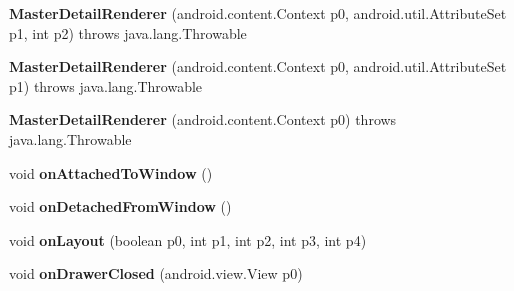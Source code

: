 \begin{DoxyCompactItemize}
\item 
\mbox{\label{classmd5b60ffeb829f638581ab2bb9b1a7f4f3f_1_1_master_detail_renderer_a151e8a0190a84dac40712c929fe981f1}} 
{\bfseries Master\+Detail\+Renderer} (android.\+content.\+Context p0, android.\+util.\+Attribute\+Set p1, int p2)  throws java.\+lang.\+Throwable 	
\item 
\mbox{\label{classmd5b60ffeb829f638581ab2bb9b1a7f4f3f_1_1_master_detail_renderer_a20b50dd51874695ded02789310f2c483}} 
{\bfseries Master\+Detail\+Renderer} (android.\+content.\+Context p0, android.\+util.\+Attribute\+Set p1)  throws java.\+lang.\+Throwable 	
\item 
\mbox{\label{classmd5b60ffeb829f638581ab2bb9b1a7f4f3f_1_1_master_detail_renderer_a14ed5c8eab58b78a200c47600daacb7b}} 
{\bfseries Master\+Detail\+Renderer} (android.\+content.\+Context p0)  throws java.\+lang.\+Throwable 	
\item 
\mbox{\label{classmd5b60ffeb829f638581ab2bb9b1a7f4f3f_1_1_master_detail_renderer_acc8d8c4d884449690cd40a8f06d08aab}} 
void {\bfseries on\+Attached\+To\+Window} ()
\item 
\mbox{\label{classmd5b60ffeb829f638581ab2bb9b1a7f4f3f_1_1_master_detail_renderer_a01bbe4838a0a0c8ca1752f6a5ecd27b9}} 
void {\bfseries on\+Detached\+From\+Window} ()
\item 
\mbox{\label{classmd5b60ffeb829f638581ab2bb9b1a7f4f3f_1_1_master_detail_renderer_a2a0acae4af9b3446d79e18c5f8817773}} 
void {\bfseries on\+Layout} (boolean p0, int p1, int p2, int p3, int p4)
\item 
\mbox{\label{classmd5b60ffeb829f638581ab2bb9b1a7f4f3f_1_1_master_detail_renderer_a7be721926ef6bb33d645447e19697a2a}} 
void {\bfseries on\+Drawer\+Closed} (android.\+view.\+View p0)

\end{DoxyCompactItemize}

